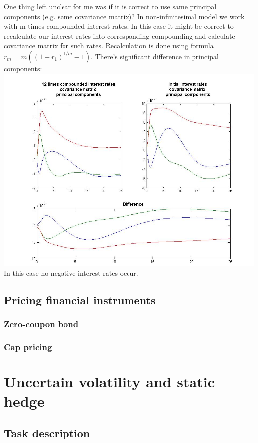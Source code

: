 \documentclass[11pt]{article} %
\begin{document}
One thing left unclear for me was if it is correct to use same principal components (e.g. same covariance matrix)? In non-infinitesimal model we work with m times compounded interest rates. In this case it might be correct to recalculate our interest rates into corresponding compounding and calculate covariance matrix for such rates. Recalculation is done using formula $r_m = m\left((1+r_1)^{1/m}-1\right)$. There's significant difference in principal components:\\
 \includegraphics[scale=0.4]{compounding_PCA.jpg}\\
In this case no negative interest rates occur.
\subsection{Pricing financial instruments}
\subsubsection{Zero-coupon bond}
\subsubsection{Cap pricing}

\section{Uncertain volatility and static hedge}
\subsection{Task description}
\end{document}
